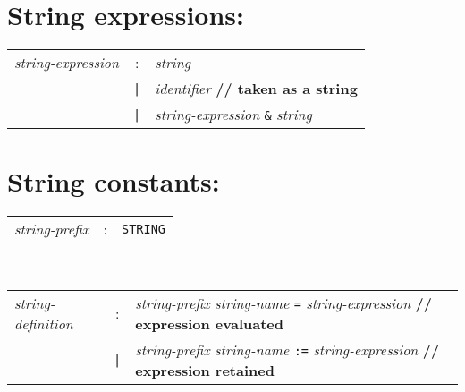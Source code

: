 \section*{String expressions:}
\begin{tabular}{p{4cm}cl}
\textit{string-expression}
  &:& \textit{string} \\
  &\texttt{|}& \textit{identifier} \textbf{// taken as a string} \\
  &\texttt{|}& \textit{string-expression} \texttt{\&} \textit{string}
\end{tabular}

\section*{String constants:}
\begin{tabular}{p{4cm}cl}
\textit{string-prefix}
  &:& \texttt{STRING}
\end{tabular}
\\
\begin{tabular}{p{4cm}cl}
\textit{string-definition}
  &:& \textit{string-prefix} \textit{string-name} \texttt{=}
    \textit{string-expression} \textbf{// expression evaluated} \\
  &\texttt{|}& \textit{string-prefix} \textit{string-name} \texttt{:=}
    \textit{string-expression} \textbf{// expression retained}
\end{tabular}

